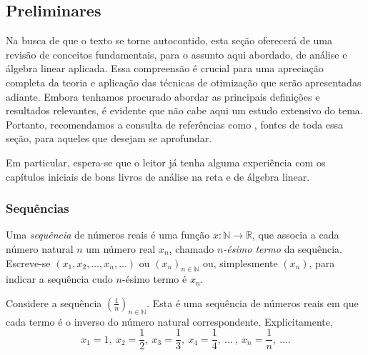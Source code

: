 
\subsection{Preliminares}
Na busca de que o texto se torne autocontido, esta seção oferecerá de uma revisão de conceitos fundamentais, para o assunto aqui abordado, de análise e álgebra linear aplicada. Essa compreensão é crucial para uma apreciação completa da teoria e aplicação das técnicas de otimização que serão apresentadas adiante. Embora tenhamos procurado abordar as principais definições e resultados relevantes, é evidente que não cabe aqui um estudo extensivo do tema. Portanto, recomendamos a consulta de referências como \cite{elonAnalise1, elonAnalise2, AlgebraLinearElon, meyer2023matrix, watkins2004fundamentals, golub2013matrix}, fontes de toda essa seção, para aqueles que desejam se aprofundar.

Em particular, espera-se que o leitor já tenha alguma experiência com os capítulos iniciais de bons livros de análise na reta e de álgebra linear.

\subsubsection{Sequências}

\begin{definicao}[Sequência]
	Uma \textit{sequência} de números reais é uma função $x:\mathbb{N}\to \mathbb{R}$, que associa a cada número natural $n$ um número real $x_n$, chamado \textit{$n$-ésimo termo} da sequência. Escreve-se $(x_1, x_2,\dots,x_n,\dots)$ ou $(x_n)_{n\in \mathbb{N}}$ ou, simplesmente $(x_n)$, para indicar a sequência cudo $n$-ésimo termo é $x_n$.
\end{definicao}
\begin{exemplo}
Considere a sequência $\left(\frac{1}{n}\right)_{n \in \mathbb{N}}$. Esta é uma sequência de números reais em que cada termo é o inverso do número natural correspondente. Explicitamente, $$ x_1 = 1, \ x_2 = \frac{1}{2},\ x_3 = \frac{1}{3},\ x_4 = \frac{1}{4},\ \dots\ ,\ x_n = \frac 1 n,\  \dots.$$
\end{exemplo}

